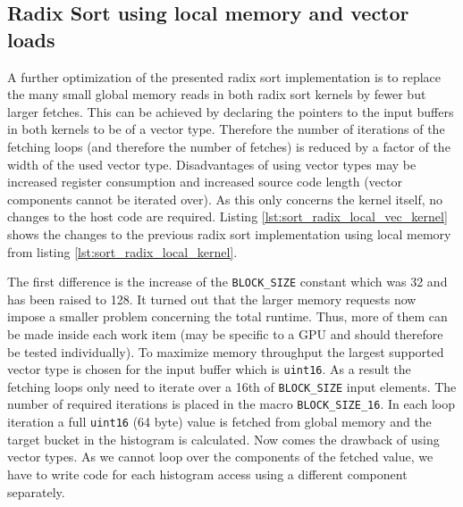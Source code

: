 \subsection{Radix Sort using local memory and vector loads}
\label{sec:sorting_radix_local_vec}

A further optimization of the presented radix sort implementation is to replace the many small global memory reads in both radix sort kernels by fewer but larger fetches. This can be achieved by declaring the pointers to the input buffers in both kernels to be of a vector type. Therefore the number of iterations of the fetching loops (and therefore the number of fetches) is reduced by a factor of the width of the used vector type. Disadvantages of using vector types may be increased register consumption and increased source code length (vector components cannot be iterated over).
As this only concerns the kernel itself, no changes to the host code are required. Listing \ref{lst:sort_radix_local_vec_kernel} shows the changes to the previous radix sort implementation using local memory from listing \ref{lst:sort_radix_local_kernel}.



The first difference is the increase of the \lstinline!BLOCK_SIZE! constant which was 32 and has been raised to 128. It turned out that the larger memory requests now impose a smaller problem concerning the total runtime. Thus, more of them can be made inside each work item (may be specific to a GPU and should therefore be tested individually). To maximize memory throughput the largest supported vector type is chosen for the input buffer which is \lstinline!uint16!. As a result the fetching loops only need to iterate over a 16th of \lstinline!BLOCK_SIZE! input elements. The number of required iterations is placed in the macro \lstinline!BLOCK_SIZE_16!. In each loop iteration a full \lstinline!uint16! (64 byte) value is fetched from global memory and the target bucket in the histogram is calculated. Now comes the drawback of using vector types. As we cannot loop over the components of the fetched value, we have to write code for each histogram access using a different component separately.

